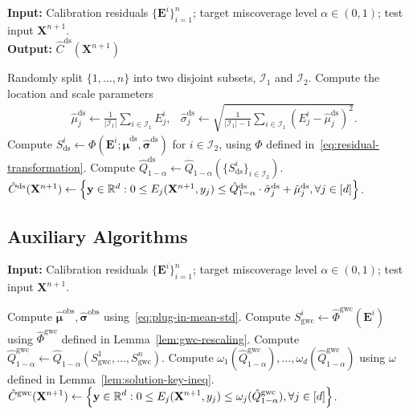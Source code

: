 \begin{algorithm}[!htb]
    \caption{Standardization with Data Splitting}
    \label{alg:std-ds}
    \textbf{Input:} Calibration residuals $\{\mathbf{E}^i\}_{i=1}^{n}$; target miscoverage level $\alpha\in(0,1)$; test input $\mathbf{X}^{n+1}$.\\
    \textbf{Output:} $\hat{C}^{\mathrm{ds}}(\mathbf{X}^{n+1})$
    \begin{algorithmic}[1]
        \State Randomly split $\{1,\ldots,n\}$ into two disjoint subsets, $\mathcal{I}_1$ and $\mathcal{I}_2$.
            \State Compute the location and scale parameters
            \begin{align*}
            & \hat{\mu}^{\mathrm{ds}}_j \gets \frac{1}{|\mathcal{I}_1|}\sum_{i \in \mathcal I_1}E^i_j,
              & \hat{\sigma}^{\mathrm{ds}}_j \gets \sqrt{\frac{1}{|\mathcal I_1|-1}\sum_{i \in \mathcal I_1}(E^i_j-\hat{\mu}^{\mathrm{ds}}_j)^2}.
            \end{align*}
        \EndFor
        \State Compute $S^i_{\mathrm{ds}} \gets \Phi(\mathbf{E}^i; \hat{\boldsymbol\mu}^{\mathrm{ds}},\hat{\boldsymbol\sigma}^{\mathrm{ds}})$ for $i \in \mathcal I_2$, using $\Phi$ defined in~\eqref{eq:residual-transformation}.
        \State Compute $\hat{Q}^\mathrm{ds}_{1-\alpha}\gets \hat{Q}_{1-\alpha}(\{S^i_\mathrm{ds}\}_{i \in \mathcal{I}_2}).$
        \State \Return $\hat{C}^{\mathrm{ds}}(\mathbf{X}^{n+1}) \gets \left\{\mathbf y \in \mathbb{R}^d: 0 \leq E_j(\mathbf{X}^{n+1}, y_j) \leq \hat{Q}^\mathrm{ds}_{1-\alpha}\cdot \hat{\sigma}^\mathrm{ds}_j + \hat{\mu}^\mathrm{ds}_j, \forall j \in [d]\right\}$.
    \end{algorithmic}
\end{algorithm}

\FloatBarrier

\subsection{Auxiliary Algorithms}

\begin{algorithm}[!htb]
\caption{Global-Worst-Case TSCP (TSCP-GWC)}
\label{alg:global}
\textbf{Input:} Calibration residuals $\{\mathbf{E}^i\}_{i=1}^{n}$; target miscoverage level $\alpha\in(0,1)$; test input $\mathbf{X}^{n+1}$.
\begin{algorithmic}[1]
\State Compute $\hat{\boldsymbol\mu}^{\mathrm{obs}}, \hat{\boldsymbol\sigma}^{\mathrm{obs}}$ using~\eqref{eq:plug-in-mean-std}.
\State Compute $S^i_{\mathrm{gwc}}\gets \hat{\Phi}^{\mathrm{gwc}}(\mathbf{E}^i)$ using $\hat{\Phi}^{\mathrm{gwc}}$ defined in Lemma~\ref{lem:gwc-rescaling}.
\State Compute $\hat{Q}^{\mathrm{gwc}}_{1-\alpha} \gets \hat{Q}_{1-\alpha}(S^1_{\mathrm{gwc}},\dots, S^n_{\mathrm{gwc}})$.
\State Compute $\omega_1(\hat{Q}^{\mathrm{gwc}}_{1-\alpha}),\ldots,\omega_d(\hat{Q}^{\mathrm{gwc}}_{1-\alpha})$ using $\omega$ defined in Lemma~\ref{lem:solution-key-ineq}.
\State \Return $\displaystyle \hat{C}^{\mathrm{gwc}}(\mathbf{X}^{n+1}) \gets \left\{\mathbf y\in \mathbb{R}^d: 0\leq E_j(\mathbf{X}^{n+1}, y_j) \leq  \omega_j(\hat{Q}^{\mathrm{gwc}}_{1-\alpha}), \forall j \in [d]\right\}$.
\end{algorithmic} 
\end{algorithm}

